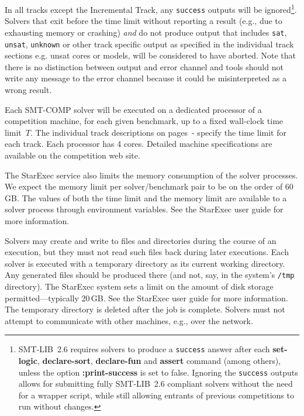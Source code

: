 \documentclass[12pt]{article}
\newcommand{\akey}[1]{\textbf{#1}\xspace}
\newcommand{\inctrack}{Incremental Track\xspace}
\begin{document}
%
In all tracks except the \inctrack, any \texttt{success} outputs will be
ignored\footnote{SMT-LIB~2.6 requires solvers to produce a \texttt{success}
  answer after each \akey{set-logic}, \akey{declare-sort}, \akey{declare-fun}
  and \akey{assert} command (among others), unless the option
  \akey{:print-success} is set to false.  Ignoring the \texttt{success} outputs
  allows for submitting fully SMT-LIB~2.6 compliant solvers without the need for
  a wrapper script, while still allowing entrants of previous competitions to
  run without changes.}.  Solvers that exit before the time limit without
reporting a result (e.g., due to exhausting memory or crashing) \emph{and} do
not produce output that includes \texttt{sat}, \texttt{unsat}, \texttt{unknown}
or other track specific output as specified in the individual track sections
e.g. unsat cores or models, will be considered to have aborted.  Note that there
is no distinction between output and error channel and tools should not write
any message to the error channel because it could be misinterpreted as a wrong
result.

%
Each SMT-COMP solver will be executed on a dedicated processor of a
competition machine, for each given benchmark, up to a fixed
wall-clock time limit~$T$. The individual track descriptions on
pages~\pageref{sec:exec:single}-\pageref{sec:exec:model} specify
the time limit for each track. Each processor has 4 cores.  Detailed
machine specifications are available on the competition web site.

The StarExec service also limits the memory consumption of the solver
processes.  We expect the memory limit per solver/benchmark pair to be
on the order of 60\,GB.  The values of both the time limit and the
memory limit are available to a solver process through environment
variables.  See the StarExec user guide for more information.

%
Solvers may create and write to files and directories during the
course of an execution, but they must not read such files back during
later executions.  Each solver is executed with a temporary directory
as its current working directory.  Any generated files should be
produced there (and not, say, in the system's \texttt{/tmp}
directory).  The StarExec system sets a limit on the amount of disk
storage permitted---typically 20\,GB.  See the StarExec user guide for
more information.  The temporary directory is deleted after the job is
complete.  Solvers must not attempt to communicate with other
machines, e.g., over the network.
\end{document}
